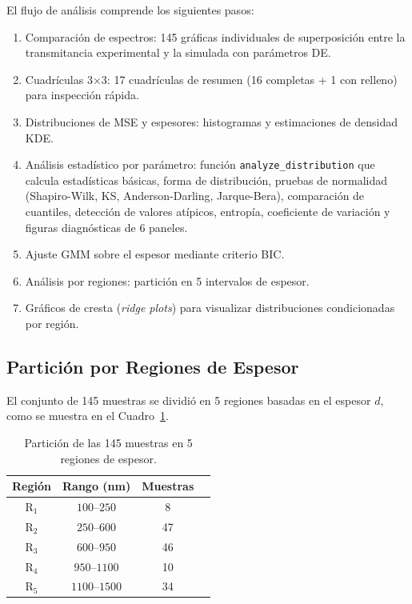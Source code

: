 \documentclass{article}
\begin{document}
El flujo de an\'alisis comprende los siguientes pasos:
\begin{enumerate}
    \item Comparaci\'on de espectros: 145 gr\'aficas individuales de superposici\'on entre la transmitancia experimental y la simulada con par\'ametros DE.
    \item Cuadr\'iculas 3$\times$3: 17 cuadr\'iculas de resumen (16 completas + 1 con relleno) para inspecci\'on r\'apida.
    \item Distribuciones de MSE y espesores: histogramas y estimaciones de densidad KDE.
    \item An\'alisis estad\'istico por par\'ametro: funci\'on \texttt{analyze\_distribution} que calcula estad\'isticas b\'asicas, forma de distribuci\'on, pruebas de normalidad (Shapiro-Wilk, KS, Anderson-Darling, Jarque-Bera), comparaci\'on de cuantiles, detecci\'on de valores at\'ipicos, entrop\'ia, coeficiente de variaci\'on y figuras diagn\'osticas de 6 paneles.
    \item Ajuste GMM sobre el espesor mediante criterio BIC.
    \item An\'alisis por regiones: partici\'on en 5 intervalos de espesor.
    \item Gr\'aficos de cresta (\textit{ridge plots}) para visualizar distribuciones condicionadas por regi\'on.
\end{enumerate}

\subsection{Partici\'on por Regiones de Espesor}

El conjunto de 145 muestras se dividi\'o en 5 regiones basadas en el espesor $d$, como se muestra en el Cuadro~\ref{tab:regions}.

\begin{table}[htbp]
\centering
\caption{Partici\'on de las 145 muestras en 5 regiones de espesor.}
\label{tab:regions}
\begin{tabular}{@{}cccc@{}}
\toprule
\textbf{Regi\'on} & \textbf{Rango (nm)} & \textbf{Muestras} \\
\midrule
R$_1$ & $100$--$250$ & 8 \\
R$_2$ & $250$--$600$ & 47 \\
R$_3$ & $600$--$950$ & 46 \\
R$_4$ & $950$--$1100$ & 10 \\
R$_5$ & $1100$--$1500$ & 34 \\
\bottomrule
\end{tabular}
\end{table}
\end{document}
